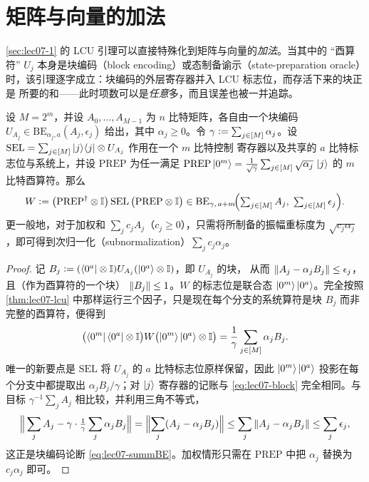 \section{矩阵与向量的加法}
\label{sec:lec07-2}

\cref{sec:lec07-1} 的 LCU 引理可以直接特殊化到矩阵与向量的\emph{加法}。当其中的
``酉算符'' $U_j$ 本身是块编码（block encoding）或态制备谕示（state-preparation
oracle）时，该引理逐字成立：块编码的外层寄存器并入 LCU 标志位，而存活下来的块正是
所要的和——此时项数可以是\emph{任意}多，而且误差也被一并追踪。

\begin{proposition}[块编码矩阵之和]
\label{prop:lec07-sum}
设 $M=2^m$，并设 $A_0,\dots,A_{M-1}$ 为 $n$ 比特矩阵，各自由一个块编码
$U_{A_j}\in\mathrm{BE}_{\alpha_j,a}(A_j,\epsilon_j)$ 给出，其中 $\alpha_j\ge0$。令
$\gamma\vcentcolon=\sum_{j\in[M]}\alpha_j$。设
$\mathrm{SEL}=\sum_{j\in[M]}\ket{j}\!\bra{j}\otimes U_{A_j}$ 作用在一个 $m$ 比特控制
寄存器以及共享的 $a$ 比特标志位与系统上，并设 $\mathrm{PREP}$ 为任一满足
$\mathrm{PREP}\ket{0^m}=\frac{1}{\sqrt\gamma}\sum_{j\in[M]}\sqrt{\alpha_j}\,\ket{j}$
的 $m$ 比特酉算符。那么
\begin{equation}
  W\vcentcolon=\bigl(\mathrm{PREP}^{\dagger}\otimes\mathbb{I}\bigr)\,\mathrm{SEL}\,
          \bigl(\mathrm{PREP}\otimes\mathbb{I}\bigr)
  \in\mathrm{BE}_{\gamma,\,a+m}\!\Bigl(\textstyle\sum_{j\in[M]}A_j,\;
     \sum_{j\in[M]}\epsilon_j\Bigr).
  \label{eq:lec07-summBE}
\end{equation}
更一般地，对于加权和 $\sum_j c_j A_j$（$c_j\ge0$），只需将所制备的振幅重标度为
$\sqrt{c_j\alpha_j}$，即可得到次归一化（subnormalization）$\sum_j c_j\alpha_j$。
\end{proposition}

\begin{proof}
记 $B_j\vcentcolon=(\bra{0^a}\otimes\mathbb{I})U_{A_j}(\ket{0^a}\otimes\mathbb{I})$，即 $U_{A_j}$ 的块，
从而 $\left\lVert A_j-\alpha_j B_j \right\rVert\le\epsilon_j$，且（作为酉算符的一个块）
$\left\lVert B_j \right\rVert\le1$。$W$ 的标志位是联合态 $\ket{0^m}\ket{0^a}$。完全按照
\cref{thm:lec07-lcu} 中那样运行三个因子，只是现在每个分支的系统算符是块 $B_j$ 而非
完整的酉算符，便得到
\begin{equation}
  \bigl(\bra{0^m}\bra{0^a}\otimes\mathbb{I}\bigr)W
  \bigl(\ket{0^m}\ket{0^a}\otimes\mathbb{I}\bigr)
  =\frac{1}{\gamma}\sum_{j\in[M]}\alpha_j B_j.
  \label{eq:lec07-sumblock}
\end{equation}
唯一的新要点是 $\mathrm{SEL}$ 将 $U_{A_j}$ 的 $a$ 比特标志位原样保留，因此
$\ket{0^m}\ket{0^a}$ 投影在每个分支中都提取出 $\alpha_j B_j/\gamma$；对
$\ket{j}$ 寄存器的记账与 \eqref{eq:lec07-block} 完全相同。与目标
$\gamma^{-1}\sum_j A_j$ 相比较，并利用三角不等式，
\begin{equation}
  \Bigl\lVert\,\sum_{j}A_j-\gamma\cdot\tfrac1\gamma\sum_j\alpha_j B_j\Bigr\rVert
  =\Bigl\lVert\sum_j(A_j-\alpha_j B_j)\Bigr\rVert
  \le\sum_j\left\lVert A_j-\alpha_j B_j \right\rVert\le\sum_j\epsilon_j,
  \label{eq:lec07-sumerr}
\end{equation}
这正是块编码论断 \eqref{eq:lec07-summBE}。加权情形只需在 $\mathrm{PREP}$ 中把
$\alpha_j$ 替换为 $c_j\alpha_j$ 即可。
\end{proof}

